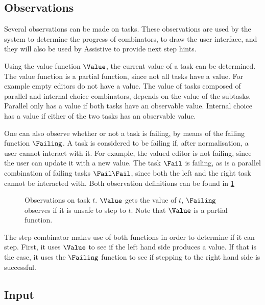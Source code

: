 \subsection{Observations}

Several observations can be made on tasks.
These observations are used by the system to determine the progress of combinators,
to draw the user interface, and they will also be used by Assistive \TOPHAT to provide next step hints.

Using the value function $\Value$, the current value of a task can be determined.
The value function is a partial function, since not all tasks have a value.
For example empty editors do not have a value.
The value of tasks composed of parallel and internal choice combinators, depends on the value of the subtasks.
Parallel only has a value if both tasks have an observable value.
Internal choice has a value if either of the two tasks has an observable value.

One can also observe whether or not a task is failing, by means of the failing function $\Failing$.
A task is considered to be failing if, after normalisation, a user cannot interact with it.
For example, the valued editor is not failing, since the user can update it with a new value.
The task $\Fail$ is failing, as is a parallel combination of failing tasks $\Fail \And \Fail$, since both the left and the right task cannot be interacted with.
Both observation definitions can be found in \cref{fig:observations}

\begin{figure}[h]
  \begin{minipage}{\textwidth}
    \centering \small
      
  \end{minipage}
  \caption{
    Observations on task $t$.
    $\Value$ gets the value of $t$, $\Failing$ observes if it is unsafe to step to $t$.
    Note that $\Value$ is a partial function.
  }
  \label{fig:observations}
\end{figure}

The step combinator makes use of both functions in order to determine if it can step.
First, it uses $\Value$ to see if the left hand side produces a value.
If that is the case, it uses the $\Failing$ function to see if stepping to the right hand side is successful.


\subsection{Input}

